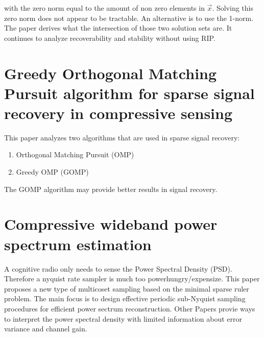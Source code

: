 \documentclass[report, oneside, a4paper, openany]{memoir}
\begin{document}
\noindent with the zero norm equal to the amount of non zero elements in $\vec{x}$. Solving this zero norm does not appear to be tractable. An alternative is to use the 1-norm. The paper derives what the intersection of those two solution sets are. It continues to analyze recoverability and stability without using RIP.
\section{Greedy Orthogonal Matching Pursuit algorithm for sparse signal recovery in compressive sensing \cite{li2014gomp}}
This paper analyzes two algorithms that are used in sparse signal recovery:

\begin{enumerate}
	\item Orthogonal Matching Pursuit (OMP)
	\item Greedy OMP (GOMP)
\end{enumerate}

The GOMP algorithm may provide better results in signal recovery.
\section{Compressive wideband power spectrum estimation \cite{ariananda2012compressive}}
%
A cognitive radio only needs to sense the Power Spectral Density (PSD). Therefore a nyquist rate sampler is much too powerhungry/expensize. This paper proposes a new type of multicoset sampling based on the minimal sparse ruler problem. The main focus is to design effective periodic sub-Nyquist sampling procedures for efficient power sectrum reconstruction. Other Papers provie ways to interpret the power spectral density with limited information about error variance and channel gain.
\end{document}
